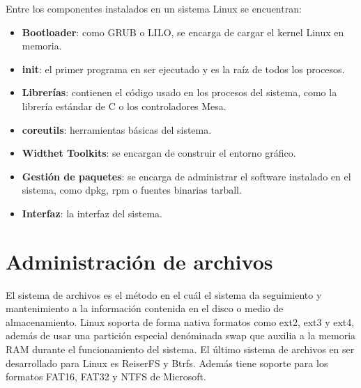 \documentclass[11pt,letterpaper]{article} 	%
\begin{document}
Entre los componentes instalados en un sistema Linux se encuentran:
\begin{itemize}
	\item \textbf{Bootloader}: como GRUB o LILO, se encarga de cargar el kernel Linux en memoria.
	\item \textbf{init}: el primer programa en ser ejecutado y es la raíz de todos los procesos.
	\item \textbf{Librerías}: contienen el código usado en los procesos del sistema, como la librería estándar de C o los controladores Mesa.
	\item \textbf{coreutils}: herramientas básicas del sistema.
	\item \textbf{Widthet Toolkits}: se encargan de construir el entorno gráfico.
	\item \textbf{Gestión de paquetes}: se encarga de administrar el software instalado en el sistema, como dpkg, rpm o fuentes binarias tarball.
	\item \textbf{Interfaz}: la interfaz del sistema.
\end{itemize}

\section*{Administración de archivos}
El sistema de archivos es el método en el cuál el sistema da seguimiento y mantenimiento a la información contenida en el disco o medio de almacenamiento. Linux soporta de forma nativa formatos como ext2, ext3 y ext4, además de usar una partición especial denóminada swap que auxilia a la memoria RAM durante el funcionamiento del sistema. El último sistema de archivos en ser desarrollado para Linux es ReiserFS y Btrfs. Además tiene soporte para los formatos FAT16, FAT32 y NTFS de Microsoft.\par
\end{document}

